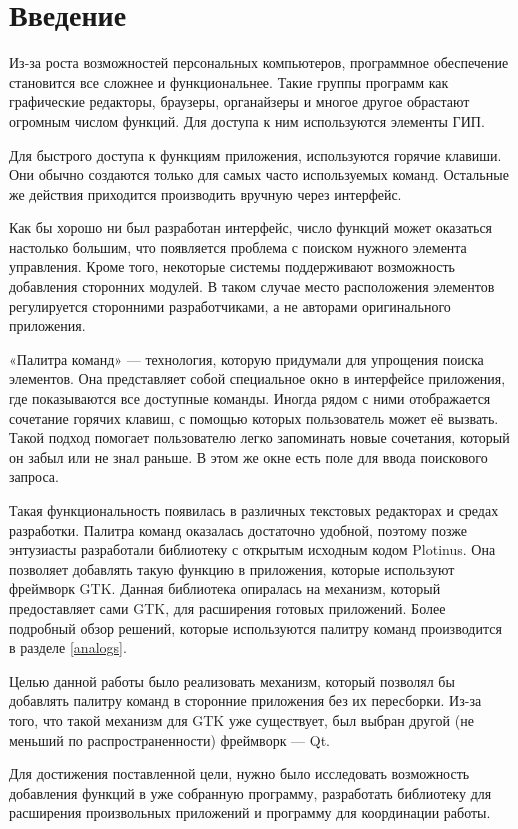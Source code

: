 \chapter*{Введение}

Из-за роста возможностей персональных компьютеров, программное обеспечение
становится все сложнее и функциональнее. Такие группы программ как графические
редакторы, браузеры, органайзеры и многое другое обрастают
огромным числом функций. Для доступа к ним используются элементы ГИП.

Для быстрого доступа к функциям приложения, используются горячие клавиши. Они
обычно создаются только для самых часто используемых команд. Остальные
же действия приходится производить вручную через интерфейс.

Как бы хорошо ни был разработан интерфейс, число функций может оказаться
настолько большим, что появляется проблема с поиском нужного элемента
управления. Кроме того, некоторые системы поддерживают возможность добавления
сторонних модулей. В таком случае место расположения элементов регулируется
сторонними разработчиками, а не авторами оригинального приложения.

«Палитра команд» — технология, которую придумали для упрощения поиска элементов.
Она представляет собой специальное окно в интерфейсе приложения, где
показываются все доступные команды. Иногда рядом с ними отображается
сочетание горячих клавиш, с помощью которых пользователь может её вызвать. Такой
подход помогает пользователю легко запоминать новые сочетания, который он забыл
или не знал раньше.  В этом же окне есть поле для ввода поискового запроса.

Такая функциональность появилась в различных текстовых редакторах и
средах разработки. Палитра команд оказалась достаточно удобной, поэтому позже
энтузиасты разработали библиотеку с открытым исходным кодом Plotinus. Она
позволяет добавлять такую функцию в приложения, которые используют фреймворк
GTK. Данная библиотека опиралась на механизм, который предоставляет сами GTK,
для расширения готовых приложений. Более подробный обзор решений,
которые используются палитру команд производится в разделе \ref{analogs}.

Целью данной работы было реализовать механизм, который позволял бы добавлять
палитру команд в сторонние приложения без их пересборки. Из-за того, что такой
механизм для GTK уже существует, был выбран другой (не меньший по
распространенности) фреймворк — Qt.

Для достижения поставленной цели, нужно было исследовать возможность
добавления функций в уже собранную программу, разработать библиотеку для
расширения произвольных приложений и программу для координации работы.

